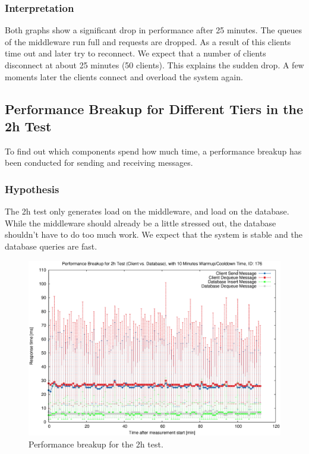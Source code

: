\documentclass[milestone1.tex]{subfiles}
\begin{document}
\subsubsection{Interpretation}
Both graphs show a significant drop in performance after 25 minutes. The queues of the middleware run full and requests are dropped. As a result of this clients time out and later try to reconnect. We expect that a number of clients disconnect at about 25 minutes (50 clients). This explains the sudden drop. A few moments later the clients connect and overload the system again.


\subsection{Performance Breakup for Different Tiers in the 2h Test}

To find out which components spend how much time, a performance breakup has been conducted for sending and receiving messages.

\subsubsection{Hypothesis}
The 2h test only generates load on the middleware, and load on the database. While the middleware should already be a little stressed out, the database shouldn't have to do too much work. We expect that the system is stable and the database queries are fast.

\begin{figure}[H]
        \begin{center}
    \includegraphics[scale=0.55]{../exported_plots/2h/performance_breakup.eps}
  \end{center}
  \caption{Performance breakup for the 2h test.}
  \label{fig:performancebreakup2h}
\end{figure}
\end{document}
